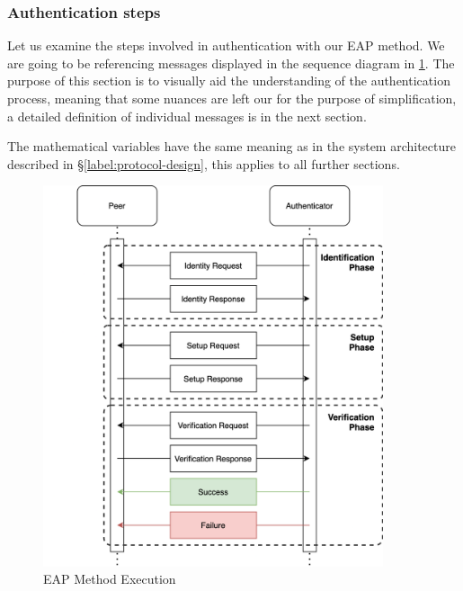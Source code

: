 \subsubsection{Authentication steps}
Let us examine the steps involved in authentication with our EAP method. We are going to be referencing messages displayed in the sequence diagram in \ref{fig:eap-84}.
The purpose of this section is to visually aid the understanding of the authentication process, meaning that some nuances are left our for the purpose of simplification, a detailed definition of individual messages is in the next section.

The mathematical variables have the same meaning as in the system architecture described in \S\ref{label:protocol-design}, this applies to all further sections.

\begin{figure}[h!]
	\centering
	\includegraphics[width=10cm]{images/eap-zkp}
	\caption{EAP Method Execution}
	\label{fig:eap-84}
\end{figure}

